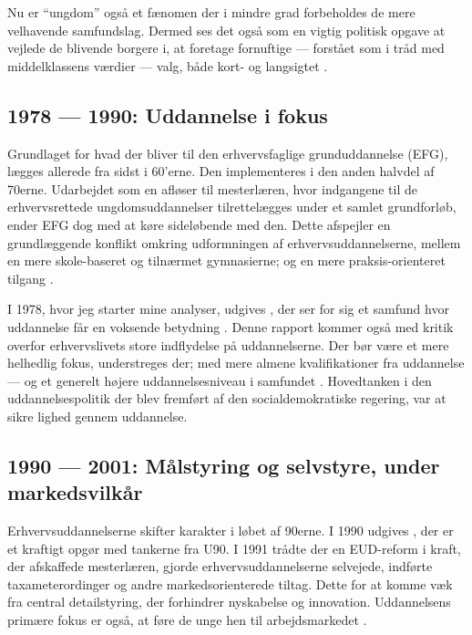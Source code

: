 Nu er “ungdom” også et fænomen der i mindre grad forbeholdes de mere velhavende samfundslag.
Dermed ses det også som en vigtig politisk opgave at vejlede de blivende borgere i, at foretage fornuftige — forstået som i tråd med middelklassens værdier — valg, både kort- og langsigtet \autocite[s. 13ff]{juulDiskurserOmUngdom2013}.

\subsection{1978 — 1990: Uddannelse i fokus}
Grundlaget for hvad der bliver til den erhvervsfaglige grunduddannelse (EFG), lægges allerede fra sidst i 60'erne.
Den implementeres i den anden halvdel af 70erne.
Udarbejdet som en afløser til mesterlæren, hvor indgangene til de erhvervsrettede ungdomsuddannelser tilrettelægges under et samlet grundforløb, ender EFG dog med at køre sideløbende med den. 
Dette afspejler en grundlæggende konflikt omkring udformningen af erhvervsuddannelserne, mellem en mere skole-baseret og tilnærmet gymnasierne; og en mere praksis-orienteret tilgang \autocite[s. 49ff, 57]{bondergaardHistoricalEmergenceKey2014}.

I 1978, hvor jeg starter mine analyser, udgives , der ser for sig et samfund hvor uddannelse får en voksende betydning \autocite{undervisningsministeriet90SamletUddannelsesplanlaegning1978}.
Denne rapport kommer også med kritik overfor erhvervslivets store indflydelse på uddannelserne.
Der bør være et mere helhedlig fokus, understreges der; med mere almene kvalifikationer fra uddannelse — og et generelt højere uddannelsesniveau i samfundet \autocite[s 18f]{juulDiskurserOmUngdom2013}.
Hovedtanken i den uddannelsespolitik der blev fremført af den socialdemokratiske regering, var at sikre lighed gennem uddannelse.

\subsection{1990 — 2001: Målstyring og selvstyre, under markedsvilkår}

Erhvervsuddannelserne skifter karakter i løbet af 90erne.
I 1990 udgives , der er et kraftigt opgør med tankerne fra U90.
I 1991 trådte der en EUD-reform i kraft, der afskaffede mesterlæren, gjorde erhvervsuddannelserne selvejede, indførte taxameterordinger og andre markedsorienterede tiltag.
Dette for at komme væk fra central detailstyring, der forhindrer nyskabelse og innovation.
Uddannelsens primære fokus er også, at føre de unge hen til arbejdsmarkedet \autocite[s. 19]{juulDiskurserOmUngdom2013}.

